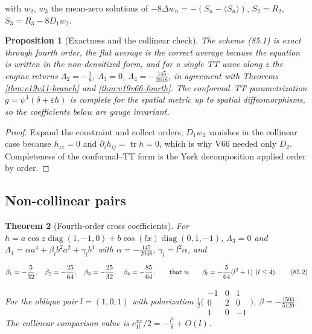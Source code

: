 \documentclass[11pt]{article}
\newtheorem{theorem}{Theorem}[section]
\newtheorem{proposition}[theorem]{Proposition}
\theoremstyle{remark}
\begin{document}
with \(w_2\), \(w_3\) the mean-zero solutions of
\(-8\Delta w_n=-(S_n-\langle S_n\rangle)\), \(S_2=R_2\),
\(S_3=R_3-8D_1w_2\).

\begin{proposition}[Exactness and the collinear check]
\label{prop:v19v82-scheme}
The scheme (85.1) is exact through fourth order, the flat average is
the correct average because the equation is written in the
non-densitized form, and for a single TT wave along \(z\) the engine
returns \(\Lambda_2=-\tfrac18\), \(\Lambda_3=0\), \(\Lambda_4=-\tfrac{145}{2048}\),
in agreement with Theorems \ref{thm:v19v41-branch} and
\ref{thm:v19v66-fourth}.  The conformal--TT parametrization
\(g=\psi^4(\delta+\varepsilon h)\) is complete for the spatial metric
up to spatial diffeomorphisms, so the coefficients below are gauge
invariant.
\end{proposition}

\begin{proof}
Expand the constraint and collect orders; \(D_1w_2\) vanishes in the
collinear case because \(h_{zz}=0\) and \(\partial_ih_{ij}=\operatorname{tr}h=0\),
which is why V66 needed only \(D_2\).  Completeness of the
conformal--TT form is the York decomposition applied order by order.
\end{proof}

\subsection{Non-collinear pairs}

\begin{theorem}[Fourth-order cross coefficients]
\label{thm:v19v82-cross}
For \(h=a\cos z\operatorname{diag}(1,-1,0)+b\cos(lx)\operatorname{diag}(0,1,-1)\),
\(\Lambda_3=0\) and \(\Lambda_4=\alpha a^4+\beta_lb^2a^2+\gamma_lb^4\)
with \(\alpha=-\tfrac{145}{2048}\), \(\gamma_l=l^2\alpha\), and

\[
 \beta_1=-\frac5{32},\quad\beta_2=-\frac{25}{64},\quad\beta_3=-\frac{25}{32},\quad\beta_4=-\frac{85}{64},
 \qquad\hbox{that is}\qquad \beta_l=-\frac5{64}(l^2+1)\ (l\leq4).            \tag{85.2}
\]

For the oblique pair \(l=(1,0,1)\) with polarization
\(\tfrac12\bigl(\begin{smallmatrix}-1&0&1\\0&2&0\\1&0&-1\end{smallmatrix}\bigr)\),
\(\beta=-\tfrac{1503}{5120}\).  The collinear comparison value is
\(c^{xx}_{1l}/2=-\tfrac{l^2}8+O(l)\).
\end{theorem}
\end{document}
